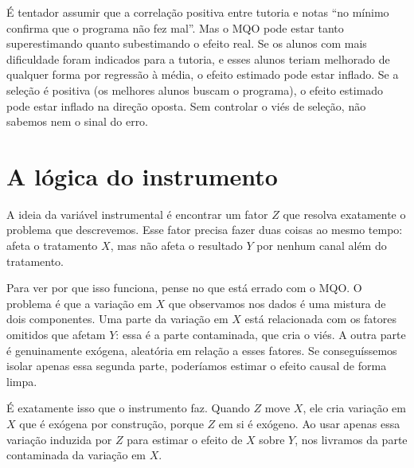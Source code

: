 \begin{atencaobox}
É tentador assumir que a correlação positiva entre tutoria e notas ``no mínimo confirma que o programa não fez mal''. Mas o MQO pode estar tanto superestimando quanto subestimando o efeito real. Se os alunos com mais dificuldade foram indicados para a tutoria, e esses alunos teriam melhorado de qualquer forma por regressão à média, o efeito estimado pode estar inflado. Se a seleção é positiva (os melhores alunos buscam o programa), o efeito estimado pode estar inflado na direção oposta. Sem controlar o viés de seleção, não sabemos nem o sinal do erro.
\end{atencaobox}

\section{A lógica do instrumento}
\label{sec:logica_instrumento}

A ideia da variável instrumental é encontrar um fator $Z$ que resolva exatamente o problema que descrevemos. Esse fator precisa fazer duas coisas ao mesmo tempo: afeta o tratamento $X$, mas não afeta o resultado $Y$ por nenhum canal além do tratamento.

Para ver por que isso funciona, pense no que está errado com o MQO. O problema é que a variação em $X$ que observamos nos dados é uma mistura de dois componentes. Uma parte da variação em $X$ está relacionada com os fatores omitidos que afetam $Y$: essa é a parte contaminada, que cria o viés. A outra parte é genuinamente exógena, aleatória em relação a esses fatores. Se conseguíssemos isolar apenas essa segunda parte, poderíamos estimar o efeito causal de forma limpa.

É exatamente isso que o instrumento faz. Quando $Z$ move $X$, ele cria variação em $X$ que é exógena por construção, porque $Z$ em si é exógeno. Ao usar apenas essa variação induzida por $Z$ para estimar o efeito de $X$ sobre $Y$, nos livramos da parte contaminada da variação em $X$.

